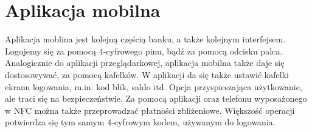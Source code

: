 \documentclass[12pt]{article}
\begin{document}
 \section{Aplikacja mobilna}
 Aplikacja moblina jest kolejną częścią banku, a także kolejnym interfejsem. Logujemy się za pomocą 4-cyfrowego pinu, bądź za pomocą odcisku palca. Analogicznie do aplikacji przeglądarkowej, aplikacja mobilna także daje się dostosowywać, za pomocą kafelków. W aplikacji da się także ustawić kafelki ekranu logowania, m.in. kod blik, saldo itd. Opcja przyspieszająca użytkowanie, ale traci się na bezpieczeństwie. Za pomocą aplikacji oraz telefonu wyposażonego w NFC można także przeprowadzać płatności zbliżeniowe. Większość operacji potwierdza się tym samym 4-cyfrowym kodem, używanym do logowania.
 
\end{document}
